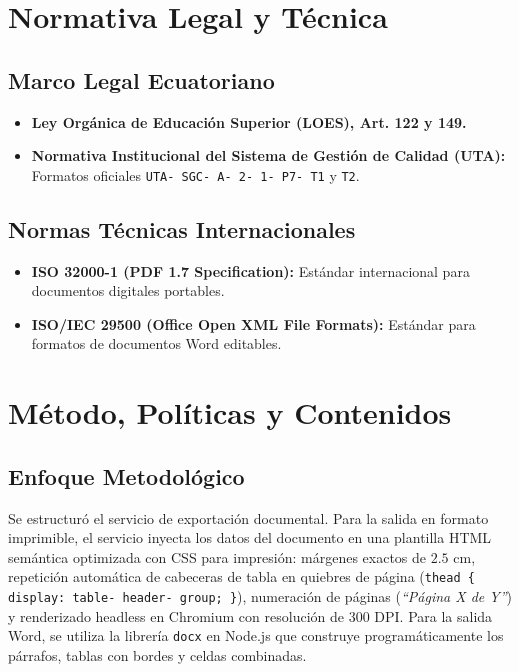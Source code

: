 \documentclass[12pt,a4paper]{article}
\begin{document}
\section{Normativa Legal y Técnica}
\subsection{Marco Legal Ecuatoriano}
\begin{itemize}[leftmargin=1.5em, itemsep=2pt]
    \item \textbf{Ley Orgánica de Educación Superior (LOES), Art. 122 y 149.}
    \item \textbf{Normativa Institucional del Sistema de Gestión de Calidad (UTA):} Formatos oficiales \texttt{UTA- SGC- A- 2- 1- P7- T1} y \texttt{T2}.
\end{itemize}
\subsection{Normas Técnicas Internacionales}
\begin{itemize}[leftmargin=1.5em, itemsep=2pt]
    \item \textbf{ISO 32000-1 (PDF 1.7 Specification):} Estándar internacional para documentos digitales portables.
    \item \textbf{ISO/IEC 29500 (Office Open XML File Formats):} Estándar para formatos de documentos Word editables.
\end{itemize}

\section{Método, Políticas y Contenidos}
\subsection{Enfoque Metodológico}
Se estructuró el servicio de exportación documental. Para la salida en formato imprimible, el servicio inyecta los datos del documento en una plantilla HTML semántica optimizada con CSS para impresión: márgenes exactos de $2.5\text{ cm}$, repetición automática de cabeceras de tabla en quiebres de página (\texttt{thead \{ display: table- header- group; \}}), numeración de páginas (\textit{``Página X de Y''}) y renderizado headless en Chromium con resolución de 300 DPI. Para la salida Word, se utiliza la librería \texttt{docx} en Node.js que construye programáticamente los párrafos, tablas con bordes y celdas combinadas.
\end{document}
